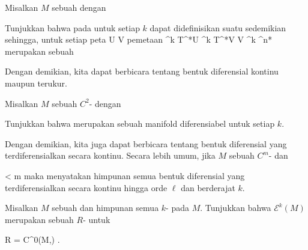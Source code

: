 \setcounter{section}{14}


{}
{

Misalkan $M$ sebuah
dengan

 Tunjukkan bahwa pada
 untuk setiap $k$ dapat didefinisikan suatu
sedemikian sehingga, untuk setiap peta
\maabb {\alpha} { U } { V
} {}
pemetaan
\maabbdisp {} {\bigwedge^k T^*U} { \bigwedge^k T^*V \cong V \times \bigwedge^k \R^{n*}
} {}
merupakan sebuah

}
{} {}
Dengan demikian, kita dapat berbicara tentang bentuk diferensial kontinu maupun terukur.

{}
{

Misalkan $M$ sebuah
$C^2$-
dengan

 Tunjukkan bahwa
 merupakan sebuah manifold diferensiabel untuk setiap $k$.

}
{} {}
Dengan demikian, kita juga dapat berbicara tentang bentuk diferensial yang terdiferensialkan secara kontinu. Secara lebih umum, jika $M$ sebuah
$C^m$-
dan

\mavergleichskette
{\vergleichskette
{  \ell
}
{ < }{ m
}
{  }{
}
{    }{
}
{   }{
}
}
{}{}{}
maka
 menyatakan himpunan semua bentuk diferensial yang terdiferensialkan secara kontinu hingga orde $\ell$ dan berderajat $k$.

{}
{

Misalkan $M$ sebuah
dan
 himpunan semua
$k$-
pada $M$. Tunjukkan bahwa ${ \mathcal E }^{ k } (  M   )$ merupakan sebuah
$R$-
untuk

\mavergleichskette
{\vergleichskette
{R
}
{ = }{ C^0(M,\R)
}
{  }{
}
{    }{
}
{   }{
}
}
{}{}{.}

}
{} {}

